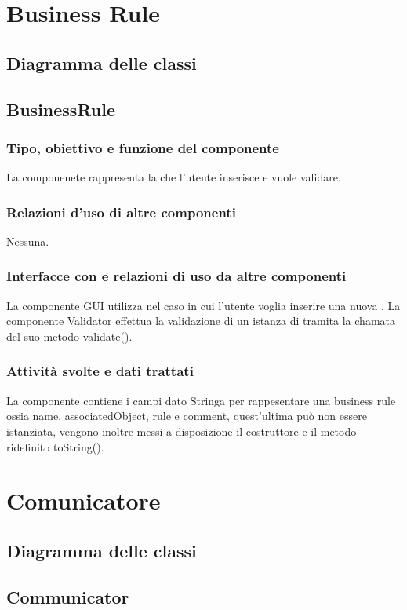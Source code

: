 \documentclass[11pt,titlepage,a4paper]{report}
\begin{document}
\section{Business Rule}
\subsection{Diagramma delle classi}
\subsection{BusinessRule}
\subsubsection{Tipo, obiettivo e funzione del componente}
La componenete \BR rappresenta la \br che l'utente inserisce e vuole validare.
\subsubsection{Relazioni d'uso di altre componenti}
Nessuna.
\subsubsection{Interfacce con e relazioni di uso da altre componenti}
La componente GUI utilizza \BR nel caso in cui l'utente voglia inserire una nuova \br.
La componente Validator effettua la validazione di un istanza di \BR tramita la chamata del suo metodo validate().
\subsubsection{Attivit\`a svolte e dati trattati}
La componente contiene i campi dato Stringa per rappesentare una business rule ossia name, associatedObject, rule e comment, quest'ultima può non essere istanziata, vengono inoltre messi a disposizione il costruttore e il metodo ridefinito toString().

\section{Comunicatore}
\subsection{Diagramma delle classi}
\subsection{Communicator}
\end{document}
